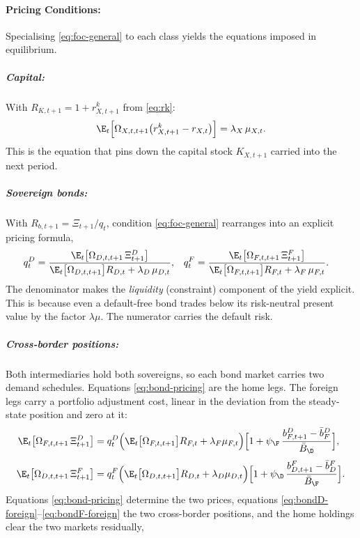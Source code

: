 \paragraph{Pricing Conditions:} Specialising \eqref{eq:foc-general} to each class yields the equations imposed in equilibrium.
\subparagraph{Capital:} With $R_{K,t+1}=1+r^{k}_{X,t+1}$ from \eqref{eq:rk}:
\begin{equation}
\E_t\Bigl[\Omega_{X,t,t+1}\bigl(r^{k}_{X,t+1}-r_{X,t}\bigr)\Bigr]
=\lambda_X\,\mu_{X,t}.
\label{eq:capital-euler}
\end{equation}
This is the equation that pins down the capital stock $K_{X,t+1}$ carried into the
next period.
\subparagraph{Sovereign bonds:} With $R_{b,t+1}=\Xi_{t+1}/q_t$, condition
\eqref{eq:foc-general} rearranges into an explicit pricing formula,
\begin{align}
q^{D}_{t}&=\frac{\E_t\bigl[\Omega_{D,t,t+1}\,\Xi^{D}_{t+1}\bigr]}
                 {\E_t\bigl[\Omega_{D,t,t+1}\bigr]R_{D,t}+\lambda_D\,\mu_{D,t}},
&
q^{F}_{t}&=\frac{\E_t\bigl[\Omega_{F,t,t+1}\,\Xi^{F}_{t+1}\bigr]}
                 {\E_t\bigl[\Omega_{F,t,t+1}\bigr]R_{F,t}+\lambda_F\,\mu_{F,t}} .
\label{eq:bond-pricing}
\end{align}
The denominator makes the \emph{liquidity} (constraint) component of the yield
explicit. This is because even a default-free bond trades below its risk-neutral present value by the factor $\lambda\mu$. The numerator carries the default risk.
\subparagraph{Cross-border positions:} Both intermediaries hold both sovereigns, so
each bond market carries two demand schedules. Equations \eqref{eq:bond-pricing}
are the home legs. The foreign legs carry a portfolio adjustment cost, linear in
the deviation from the steady-state position and zero at it:
\begin{align}
\E_t\bigl[\Omega_{F,t,t+1}\,\Xi^{D}_{t+1}\bigr]
&=q^{D}_{t}\Bigl(\E_t\bigl[\Omega_{F,t,t+1}\bigr]R_{F,t}+\lambda_F\mu_{F,t}\Bigr)
  \Bigl[1+\psi_\F\,\frac{b^{D}_{F,t+1}-\bar b^{D}_{F}}{\bar B_\D}\Bigr],
\label{eq:bondD-foreign}\\[3pt]
\E_t\bigl[\Omega_{D,t,t+1}\,\Xi^{F}_{t+1}\bigr]
&=q^{F}_{t}\Bigl(\E_t\bigl[\Omega_{D,t,t+1}\bigr]R_{D,t}+\lambda_D\mu_{D,t}\Bigr)
  \Bigl[1+\psi_\D\,\frac{b^{F}_{D,t+1}-\bar b^{F}_{D}}{\bar B_\F}\Bigr].
\label{eq:bondF-foreign}
\end{align}
Equations \eqref{eq:bond-pricing} determine the two prices, equations
\eqref{eq:bondD-foreign}--\eqref{eq:bondF-foreign} the two cross-border positions,
and the home holdings clear the two markets residually,
